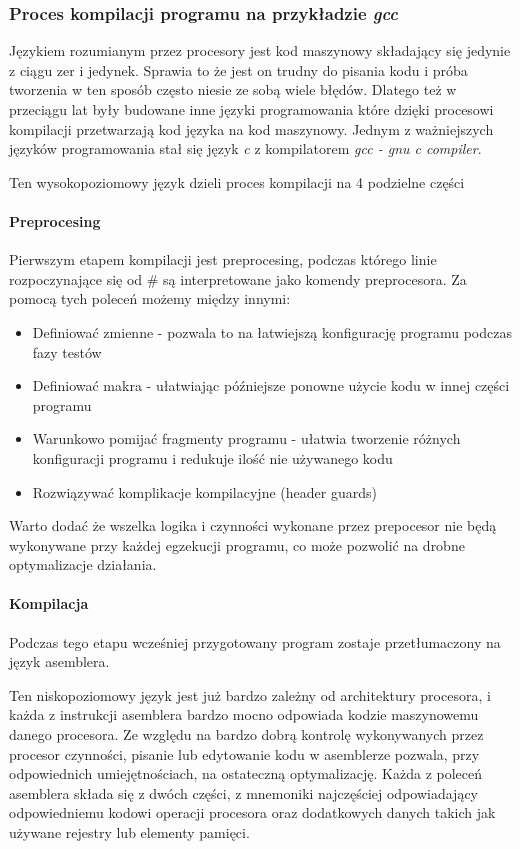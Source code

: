 \documentclass[a4paper,12pt]{article}
\begin{document}
\subsubsection{Proces kompilacji programu na przykładzie \textit{gcc}}

Językiem rozumianym przez procesory jest kod maszynowy składający się jedynie z ciągu zer i jedynek.
Sprawia to że jest on trudny do pisania kodu i próba tworzenia w ten sposób często niesie ze sobą wiele błędów. 
Dlatego też w przeciągu lat były budowane inne języki programowania które dzięki procesowi kompilacji przetwarzają kod języka na kod maszynowy. 
Jednym z ważniejszych języków programowania stał się język \textit{c} z kompilatorem \textit{gcc - gnu c compiler}. 

Ten wysokopoziomowy język dzieli proces kompilacji na 4 podzielne części

\paragraph{Preprocesing}

Pierwszym etapem kompilacji jest preprocesing, podczas którego linie rozpoczynające się od \# są interpretowane jako komendy preprocesora.  
Za pomocą tych poleceń możemy między innymi:
\begin{itemize}
        \item Definiować zmienne - pozwala to na łatwiejszą konfigurację programu podczas fazy testów
        \item Definiować makra - ułatwiając późniejsze ponowne użycie kodu w innej części programu
        \item Warunkowo pomijać fragmenty programu - ułatwia tworzenie różnych konfiguracji programu i redukuje ilość nie używanego kodu
        \item Rozwiązywać komplikacje kompilacyjne (header guards)
\end{itemize}
Warto dodać że wszelka logika i czynności wykonane przez prepocesor nie będą wykonywane przy każdej egzekucji programu, co może pozwolić na drobne optymalizacje działania. 

\paragraph{Kompilacja}

Podczas tego etapu wcześniej przygotowany program zostaje przetłumaczony na język asemblera. 

Ten niskopoziomowy język jest już bardzo zależny od architektury procesora, i każda z  instrukcji asemblera bardzo mocno odpowiada kodzie maszynowemu danego procesora. 
Ze względu na bardzo dobrą kontrolę wykonywanych przez procesor czynności, pisanie lub edytowanie kodu w asemblerze pozwala, przy odpowiednich umiejętnościach, na ostateczną optymalizację. 
Każda z poleceń asemblera składa się z dwóch części, z mnemoniki najczęściej odpowiadający odpowiedniemu kodowi operacji procesora oraz dodatkowych danych takich jak używane rejestry lub elementy pamięci. 
\end{document}

